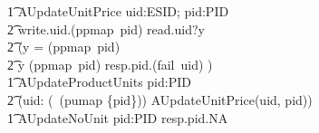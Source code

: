 \begin{circus}
        \t1 AUpdateUnitPrice \circdef uid:ESID; pid:PID \circspot \\
            \t2 write.uid.(ppmap~pid) \then read.uid?y \then \\
            \t2 (\lcircguard y = (ppmap~pid) \rcircguard \circguard \Skip \\
            \t2 \extchoice \lcircguard y \neq (ppmap~pid) \rcircguard \circguard resp.pid.(fail~uid) \then \Skip) \\
        \t1 AUpdateProductUnits \circdef pid:PID \circspot \\
            \t2 (\Interleave uid: (\dom~(pumap \rres \{pid\}))  \circspot AUpdateUnitPrice(uid, pid)) \\
        \t1 AUpdateNoUnit \circdef  pid:PID \circspot resp.pid.NA \then \Skip \\
%

\end{circus}
